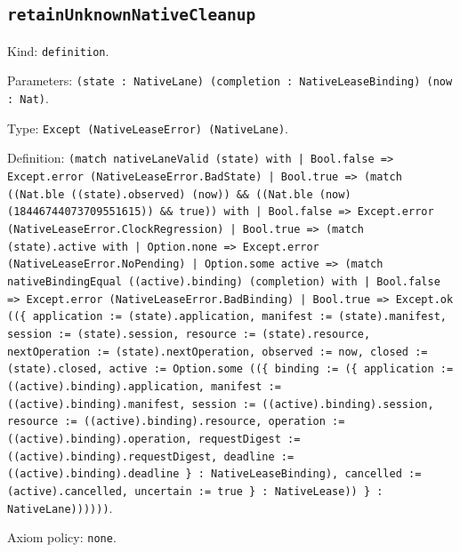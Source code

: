 \documentclass[11pt]{article}
\begin{document}
\subsection*{\texttt{retainUnknownNativeCleanup}}
\noindent Kind: \texttt{definition}.\par
\noindent Parameters: \texttt{(state : NativeLane) (completion : NativeLeaseBinding) (now : Nat)}.\par
\noindent Type: \texttt{Except (NativeLeaseError) (NativeLane)}.\par
\noindent Definition: \texttt{(match nativeLaneValid (state) with | Bool.false => Except.error (NativeLeaseError.BadState) | Bool.true => (match ((Nat.ble ((state).observed) (now)) \&\& ((Nat.ble (now) (18446744073709551615)) \&\& true)) with | Bool.false => Except.error (NativeLeaseError.ClockRegression) | Bool.true => (match (state).active with | Option.none => Except.error (NativeLeaseError.NoPending) | Option.some active => (match nativeBindingEqual ((active).binding) (completion) with | Bool.false => Except.error (NativeLeaseError.BadBinding) | Bool.true => Except.ok ((\{ application := (state).application, manifest := (state).manifest, session := (state).session, resource := (state).resource, nextOperation := (state).nextOperation, observed := now, closed := (state).closed, active := Option.some ((\{ binding := (\{ application := ((active).binding).application, manifest := ((active).binding).manifest, session := ((active).binding).session, resource := ((active).binding).resource, operation := ((active).binding).operation, requestDigest := ((active).binding).requestDigest, deadline := ((active).binding).deadline \} : NativeLeaseBinding), cancelled := (active).cancelled, uncertain := true \} : NativeLease)) \} : NativeLane))))))}.\par
\noindent Axiom policy: \texttt{none}.\par
\end{document}

